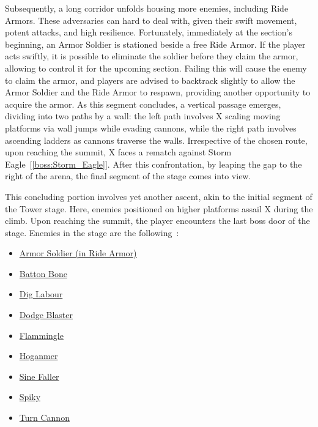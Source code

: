 Subsequently, a long corridor unfolds housing more enemies, including Ride Armors. These adversaries can hard to deal with, given their swift movement, potent attacks, and high resilience. Fortunately, immediately at the section's beginning, an Armor Soldier is stationed beside a free Ride Armor. If the player acts swiftly, it is possible to eliminate the soldier before they claim the armor, allowing to control it for the upcoming section. Failing this will cause the enemy to claim the armor, and players are advised to backtrack slightly to allow the Armor Soldier and the Ride Armor to respawn, providing another opportunity to acquire the armor. As this segment concludes, a vertical passage emerges, dividing into two paths by a wall: the left path involves X scaling moving platforms via wall jumps while evading cannons, while the right path involves ascending ladders as cannons traverse the walls. Irrespective of the chosen route, upon reaching the summit, X faces a rematch against Storm Eagle~[\ref{boss:Storm_Eagle}]. After this confrontation, by leaping the gap to the right of the arena, the final segment of the stage comes into view.

This concluding portion involves yet another ascent, akin to the initial segment of the Tower stage. Here, enemies positioned on higher platforms assail X during the climb. Upon reaching the summit, the player encounters the last boss door of the stage.
Enemies in the stage are the following~\cite{wiki:sigma_stages}:
\begin{itemize}
	\item \hyperlink{enem:Armor_Soldier}{Armor Soldier (in Ride Armor)}
	\item \hyperlink{enem:Batton_Bone}{Batton Bone}
	\item \hyperlink{enem:Dig_Labour}{Dig Labour}
	\item \hyperlink{enem:Dodge_Blaster}{Dodge Blaster}
	\item \hyperlink{enem:Flammingle}{Flammingle}
	\item \hyperlink{enem:Hoganmer}{Hoganmer}
	\item \hyperlink{enem:Sine_Faller}{Sine Faller}
	\item \hyperlink{enem:Spiky}{Spiky}
	\item \hyperlink{enem:Turn_Cannon}{Turn Cannon}
\end{itemize} 


